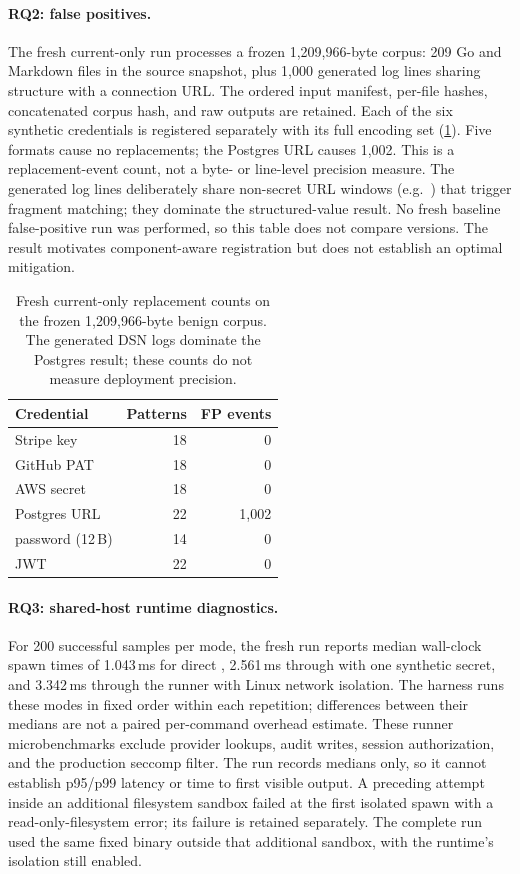 \documentclass[10pt,twocolumn]{article}
\newcommand{\code}[1]{\textup{\texttt{\detokenize{#1}}}}
\begin{document}
\paragraph{RQ2: false positives.}
The fresh current-only run processes a frozen 1,209,966-byte corpus: 209 Go and
Markdown files in the source snapshot, plus 1,000 generated log lines sharing
structure with a connection URL. The ordered input manifest, per-file hashes,
concatenated corpus hash, and raw outputs are retained. Each of the six
synthetic credentials is registered separately with its full encoding set
(\cref{tab:fp}). Five formats cause no replacements; the Postgres URL causes
1,002. This is a replacement-event count, not a byte- or line-level precision
measure. The generated log lines deliberately share non-secret URL windows
(e.g.\ \code{db.internal:5432/app}) that trigger fragment matching; they
dominate the structured-value result. No fresh baseline false-positive run
was performed, so this table does not compare versions. The result motivates
component-aware registration but does not establish an optimal mitigation.

\begin{table}[tp]
\centering\small
\begin{tabular}{@{}lrr@{}}
\toprule
Credential & Patterns & FP events \\
\midrule
Stripe key & 18 & 0 \\
GitHub PAT & 18 & 0 \\
AWS secret & 18 & 0 \\
Postgres URL & 22 & 1,002 \\
password (12\,B) & 14 & 0 \\
JWT & 22 & 0 \\
\bottomrule
\end{tabular}
\caption{Fresh current-only replacement counts on the frozen 1,209,966-byte
benign corpus. The generated DSN logs dominate the Postgres result;
these counts do not measure deployment precision.}
\label{tab:fp}
\end{table}

\paragraph{RQ3: shared-host runtime diagnostics.}
For 200 successful samples per mode, the fresh run reports median wall-clock
spawn times of 1.043\,ms for direct \code{true}, 2.561\,ms through
\code{runner.Run} with one synthetic secret, and 3.342\,ms through the runner
with Linux network isolation. The harness runs these modes in fixed order
within each repetition; differences between their medians are not a paired
per-command overhead estimate. These runner microbenchmarks exclude provider
lookups, audit writes, session authorization, and the production seccomp filter.
The run records
medians only, so it cannot establish p95/p99 latency or time to first visible
output. A preceding attempt inside an additional filesystem sandbox failed at
the first isolated spawn with a read-only-filesystem error; its failure is
retained separately. The complete run used the same fixed binary outside that
additional sandbox, with the runtime's isolation still enabled.
\end{document}
